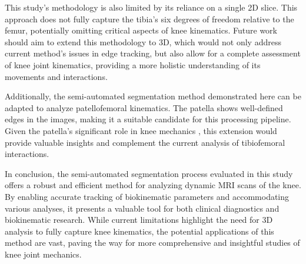 \documentclass{micro-econ-thesis}
\begin{document}
This study's methodology is also limited by its reliance on a single 2D slice. This approach does not fully capture the tibia's six degrees of freedom relative to the femur, potentially omitting critical aspects of knee kinematics. Future work should aim to extend this methodology to 3D, which would not only address current method's issues in edge tracking, but also allow for a complete assessment of knee joint kinematics, providing a more holistic understanding of its movements and interactions.

Additionally, the semi-automated segmentation method demonstrated here can be adapted to analyze patellofemoral kinematics. The patella shows well-defined edges in the images, making it a suitable candidate for this processing pipeline. Given the patella's significant role in knee mechanics \parencite{powers_evidence-based_2017}, this extension would provide valuable insights and complement the current analysis of tibiofemoral interactions.

In conclusion, the semi-automated segmentation process evaluated in this study offers a robust and efficient method for analyzing dynamic MRI scans of the knee. By enabling accurate tracking of biokinematic parameters and accommodating various analyses, it presents a valuable tool for both clinical diagnostics and biokinematic research. While current limitations highlight the need for 3D analysis to fully capture knee kinematics, the potential applications of this method are vast, paving the way for more comprehensive and insightful studies of knee joint mechanics.
\cleardoublepage
{}
{} %
\printbibliography

%
%
%
%


%
\end{document}
